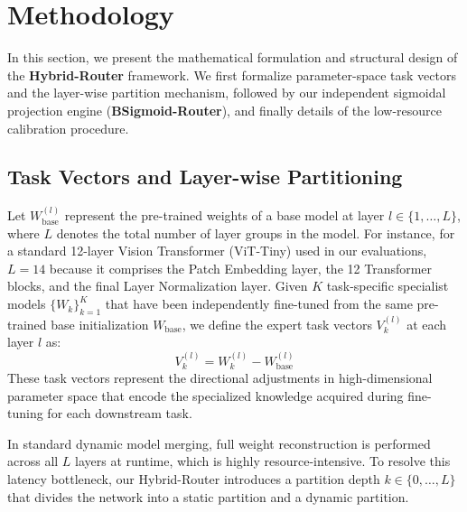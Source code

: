 \section{Methodology}
\label{sec:method}

In this section, we present the mathematical formulation and structural design of the \textbf{Hybrid-Router} framework. We first formalize parameter-space task vectors and the layer-wise partition mechanism, followed by our independent sigmoidal projection engine (\textbf{BSigmoid-Router}), and finally details of the low-resource calibration procedure.

\subsection{Task Vectors and Layer-wise Partitioning}
Let $W_{\text{base}}^{(l)}$ represent the pre-trained weights of a base model at layer $l \in \{1, \dots, L\}$, where $L$ denotes the total number of layer groups in the model. For instance, for a standard 12-layer Vision Transformer (ViT-Tiny) used in our evaluations, $L = 14$ because it comprises the Patch Embedding layer, the 12 Transformer blocks, and the final Layer Normalization layer. Given $K$ task-specific specialist models $\{W_k\}_{k=1}^K$ that have been independently fine-tuned from the same pre-trained base initialization $W_{\text{base}}$, we define the expert task vectors $V_k^{(l)}$ at each layer $l$ as:
\begin{equation}
    V_k^{(l)} = W_k^{(l)} - W_{\text{base}}^{(l)}
\end{equation}
These task vectors represent the directional adjustments in high-dimensional parameter space that encode the specialized knowledge acquired during fine-tuning for each downstream task.

In standard dynamic model merging, full weight reconstruction is performed across all $L$ layers at runtime, which is highly resource-intensive. To resolve this latency bottleneck, our Hybrid-Router introduces a partition depth $k \in \{0, \dots, L\}$ that divides the network into a static partition and a dynamic partition.


